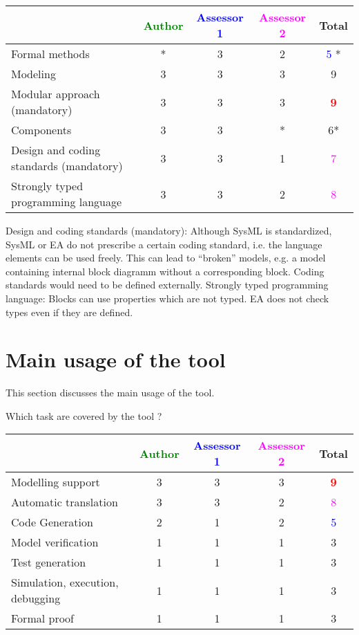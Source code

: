 \begin{tabular}{|l | c | c | c | c|}
\hline
& \textcolor{green}{Author} & \textcolor{blue}{Assessor 1} & \textcolor{magenta}{Assessor 2} & Total \\
\hline
Formal methods  &* & 3   &  2& \textcolor{blue}{5} * \\
\hline 
Modeling  &3 & 3   & 3    &  9 \\
\hline
Modular approach (mandatory) &3 & 3   & 3   & \textcolor{red}{\textbf{9}} \\
\hline
Components &3 & 3   & * &  6* \\
\hline
Design and coding standards (mandatory) &3 & 3   & 1   & \textcolor{magenta}{7} \\
\hline
Strongly typed programming language &3 & 3   & 2    & \textcolor{magenta}{8}  \\
\hline

\end{tabular}

\begin{assessor2}
Design and coding standards (mandatory): Although SysML is standardized, SysML or EA do not prescribe a certain coding standard, i.e. the language elements can be used freely. This can lead to "`broken"' models, e.g. a model containing internal block diagramm without a corresponding block. Coding standards would need to be defined externally.
Strongly typed programming language: Blocks can use properties which are not typed. EA does not check types even if they are defined.
\end{assessor2}


\section{Main usage of the tool}
\label{main_usage}

This section discusses the main usage of the tool.

Which task are covered by the tool ?


\begin{tabular}{|l | c | c | c | c|}
\hline
& \textcolor{green}{Author} & \textcolor{blue}{Assessor 1} & \textcolor{magenta}{Assessor 2} & Total \\
\hline 
Modelling support &3 & 3   & 3   & \textcolor{red}{\textbf{9}} \\
\hline
Automatic translation  &3 & 3   & 2   & \textcolor{magenta}{8} \\
\hline
Code Generation  &2 & 1   & 2   & \textcolor{blue}{5} \\
\hline
Model verification &1 & 1   & 1   & 3    \\
\hline
Test generation &1 & 1   & 1   & 3    \\
\hline
Simulation, execution, debugging &1 & 1   & 1   & 3    \\
\hline
Formal proof &1 & 1   & 1   & 3    \\
\hline
\end{tabular}

